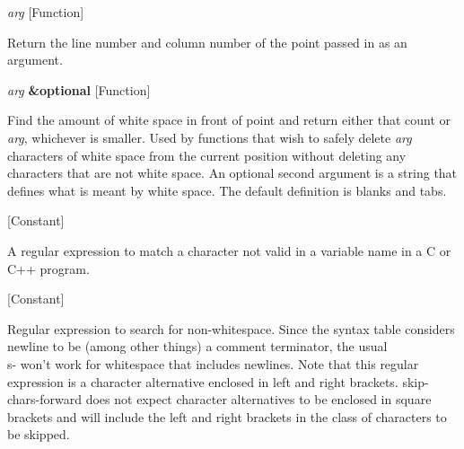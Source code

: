 \vspace{1em}
\noindent
{}
\usebox{\funcname}\emph{arg}
 \hfill [Function]

\begin{doc-string}
Return the line number and column number of the point passed in as an argument.
\end{doc-string}

\vspace{1em}
\noindent
{}
\usebox{\funcname}\emph{arg} \textbf{\&optional}
 \hfill [Function]
\hspace*{\wd\funcname}

\begin{doc-string}
Find the amount of white space in front of point and return either that
count or \emph{arg}, whichever is smaller.  Used by functions that wish to
safely delete \emph{arg} characters of white space from the current position
without deleting any characters that are not white space.
An optional second argument is a string that defines what is meant
by white space.  The default definition is blanks and tabs.
\end{doc-string}

\vspace{1em}
\noindent
{}
\usebox{\funcname}
 \hfill [Constant]

\begin{doc-string}
A regular expression to match a character not valid in a variable name
in a C or C++ program.
\end{doc-string}

\vspace{1em}
\noindent
{}
\usebox{\funcname}
 \hfill [Constant]

\begin{doc-string}
Regular expression to search for non-whitespace.  Since the syntax table considers
newline to be (among other things) a comment terminator, the usual \\s- won't work
for whitespace that includes newlines.  Note that this regular expression is a
character alternative enclosed in left and right brackets.  skip-chars-forward does
not expect character alternatives to be enclosed in square brackets and will include
the left and right brackets in the class of characters to be skipped.
\end{doc-string}

